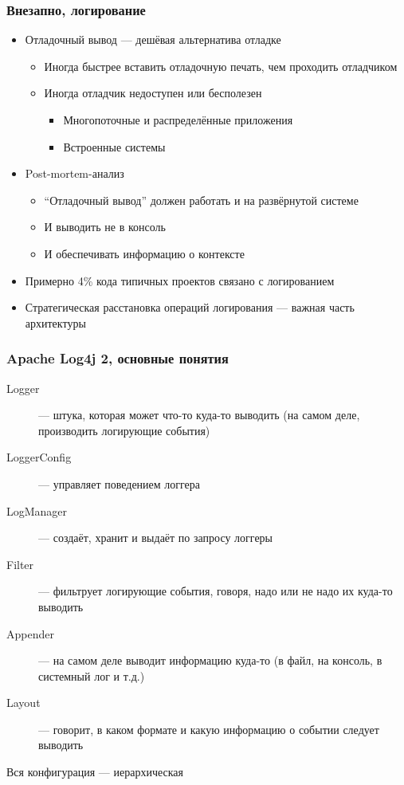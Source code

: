 \documentclass[xetex,mathserif,serif]{beamer}
\begin{document}
	\begin{frame}
		\frametitle{Внезапно, логирование}
		\begin{itemize}
			\item Отладочный вывод --- дешёвая альтернатива отладке
			\begin{itemize}
				\item Иногда быстрее вставить отладочную печать, чем проходить отладчиком
				\item Иногда отладчик недоступен или бесполезен
				\begin{itemize}
					\item Многопоточные и распределённые приложения
					\item Встроенные системы
				\end{itemize}
			\end{itemize}
			\item Post-mortem-анализ
			\begin{itemize}
				\item ``Отладочный вывод'' должен работать и на развёрнутой системе
				\item И выводить не в консоль
				\item И обеспечивать информацию о контексте
			\end{itemize}
			\item Примерно 4\% кода типичных проектов связано с логированием
			\item Стратегическая расстановка операций логирования --- важная часть архитектуры
		\end{itemize}
	\end{frame}

	\begin{frame}
		\frametitle{Apache Log4j 2, основные понятия}
		\begin{description}
			\item [Logger] --- штука, которая может что-то куда-то выводить (на самом деле, производить логирующие события)
			\item [LoggerConfig] --- управляет поведением логгера
			\item [LogManager] --- создаёт, хранит и выдаёт по запросу логгеры
			\item [Filter] --- фильтрует логирующие события, говоря, надо или не надо их куда-то выводить
			\item [Appender] --- на самом деле выводит информацию куда-то (в файл, на консоль, в системный лог и т.д.)
			\item [Layout] --- говорит, в каком формате и какую информацию о событии следует выводить
		\end{description}
		\begin{center}Вся конфигурация --- иерархическая\end{center}
	\end{frame}
\end{document}

